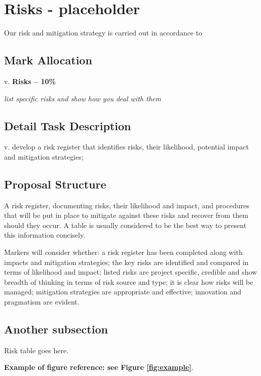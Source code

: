 \section{Risks - placeholder} \label{risks}

Our risk and mitigation strategy is carried out in accordance to \parencite{Dawson:2009:PCI:1611433} 

\subsection{Mark Allocation}

v. \textbf{Risks -- 10\%}

\textit{list specific risks and show how you deal with them}

\subsection{Detail Task Description} 

v. develop a risk register that identifies risks, their likelihood, potential impact and mitigation strategies;

\subsection{Proposal Structure}

A risk register, documenting risks, their likelihood and impact, and procedures that will be put in place to mitigate against these risks and recover from them should they occur. A table is usually considered to be the best way to present this information concisely.

Markers will consider whether: a risk register has been completed along with impacts and mitigation strategies; the key risks are identified and compared in terms of likelihood and impact; listed risks are project specific, credible and show breadth of thinking in terms of risk source and type; it is clear how risks will be managed; mitigation strategies are appropriate and effective; innovation and pragmatism are evident.

\subsection{Another subsection}

Risk table goes here.

\textbf{Example of figure reference: see Figure \ref{fig:example}}. 
\lipsum[5]

